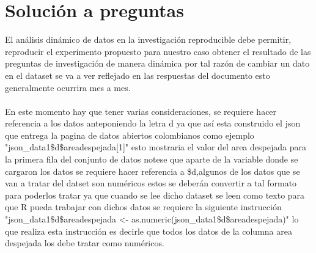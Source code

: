 \section{Solución a preguntas}
El análisis dinámico de datos en la investigación reproducible debe permitir, reproducir el experimento propuesto para nuestro caso obtener el resultado de las preguntas de investigación de manera dinámica por tal razón de cambiar un dato en el dataset se va a ver reflejado en las respuestas del documento esto generalmente ocurrira mes a mes.
\\
\\
En este momento hay que tener varias consideraciones, se requiere hacer referencia a los datos anteponiendo la letra d ya que así esta construido el json que entrega la pagina de datos abiertos colombianos como ejemplo "json_data1\$d\$areadespejada[1]" esto mostraria el valor del area despejada para la primera fila del conjunto de datos notese que aparte de la variable donde se cargaron los datos se requiere hacer referencia a \$d,algunos de los datos que se van a tratar del datset son numéricos estos se deberán convertir a tal formato para poderlos tratar ya que cuando se lee dicho dataset se leen como texto para que R pueda trabajar con dichos datos se requiere la siguiente instrucción "json_data1\$d\$areadespejada <- as.numeric(json_data1\$d\$areadespejada)" lo que realiza esta instrucción es decirle que todos los datos de la columna area despejada los debe tratar como numéricos. 



